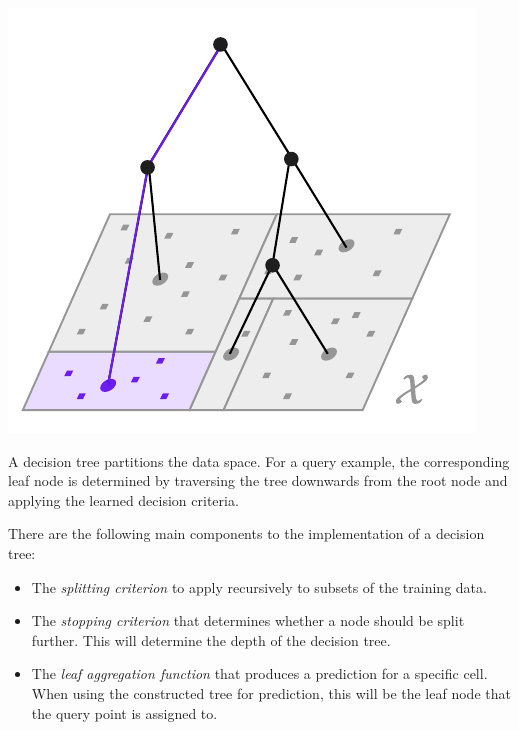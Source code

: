 \documentclass[../main.tex]{subfiles}
\begin{document}
\begin{marginfigure}
    \includegraphics[width=\textwidth]{figma-illustrations/tree-partition.pdf}
    \label{fig:tree-partition}
    \caption{A decision tree partitions the data space. For a query example, the corresponding leaf node is determined by traversing the tree downwards from the root node and applying the learned decision criteria.}
\end{marginfigure}


    

There are the following main components to the implementation of a decision tree:
\begin{itemize}
    \item The \textit{splitting criterion} to apply recursively to subsets of the training data.
    \item The \textit{stopping criterion} that determines whether a node should be split further. This will determine the depth of the decision tree.
    \item The \textit{leaf aggregation function} that produces a prediction for a specific cell. When using the constructed tree for prediction, this will be the leaf node that the query point is assigned to.
\end{itemize}
\end{document}
